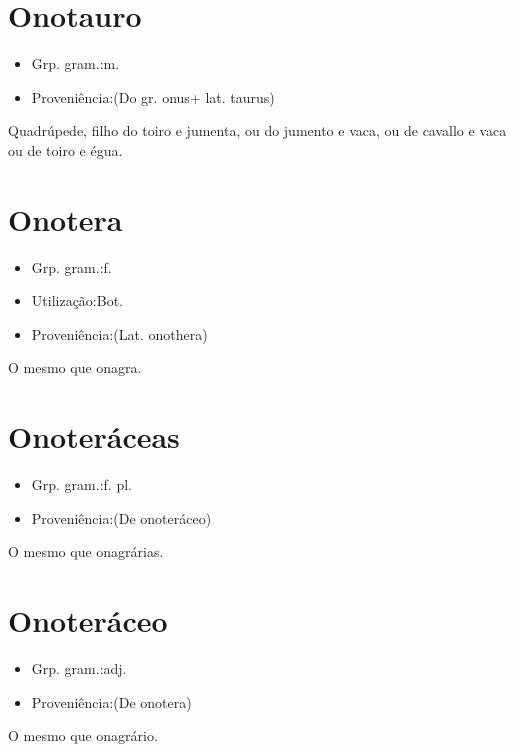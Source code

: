 \section{Onotauro}
\begin{itemize}
\item {Grp. gram.:m.}
\end{itemize}
\begin{itemize}
\item {Proveniência:(Do gr. \textunderscore onus\textunderscore  + lat. \textunderscore taurus\textunderscore )}
\end{itemize}
Quadrúpede, filho do toiro e jumenta, ou do jumento e vaca, ou de cavallo e vaca ou de toiro e égua.
\section{Onotera}
\begin{itemize}
\item {Grp. gram.:f.}
\end{itemize}
\begin{itemize}
\item {Utilização:Bot.}
\end{itemize}
\begin{itemize}
\item {Proveniência:(Lat. \textunderscore onothera\textunderscore )}
\end{itemize}
O mesmo que \textunderscore onagra\textunderscore .
\section{Onoteráceas}
\begin{itemize}
\item {Grp. gram.:f. pl.}
\end{itemize}
\begin{itemize}
\item {Proveniência:(De \textunderscore onoteráceo\textunderscore )}
\end{itemize}
O mesmo que \textunderscore onagrárias\textunderscore .
\section{Onoteráceo}
\begin{itemize}
\item {Grp. gram.:adj.}
\end{itemize}
\begin{itemize}
\item {Proveniência:(De \textunderscore onotera\textunderscore )}
\end{itemize}
O mesmo que \textunderscore onagrário\textunderscore .
